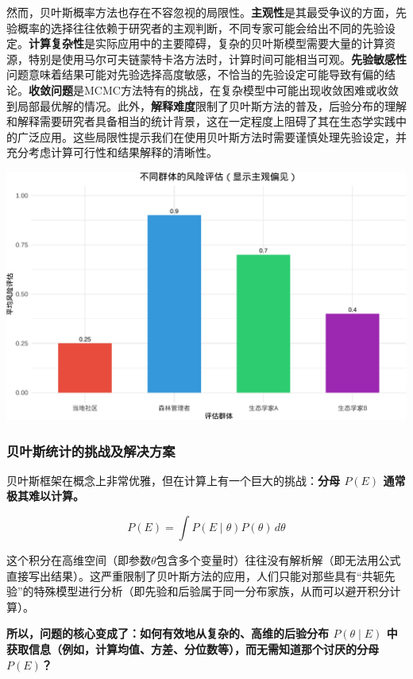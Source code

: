 \documentclass[
]{book}
\begin{document}
然而，贝叶斯概率方法也存在不容忽视的局限性。\textbf{主观性}是其最受争议的方面，先验概率的选择往往依赖于研究者的主观判断，不同专家可能会给出不同的先验设定。\textbf{计算复杂性}是实际应用中的主要障碍，复杂的贝叶斯模型需要大量的计算资源，特别是使用马尔可夫链蒙特卡洛方法时，计算时间可能相当可观。\textbf{先验敏感性}问题意味着结果可能对先验选择高度敏感，不恰当的先验设定可能导致有偏的结论。\textbf{收敛问题}是MCMC方法特有的挑战，在复杂模型中可能出现收敛困难或收敛到局部最优解的情况。此外，\textbf{解释难度}限制了贝叶斯方法的普及，后验分布的理解和解释需要研究者具备相当的统计背景，这在一定程度上阻碍了其在生态学实践中的广泛应用。这些局限性提示我们在使用贝叶斯方法时需要谨慎处理先验设定，并充分考虑计算可行性和结果解释的清晰性。

\begin{center}\includegraphics[width=0.8\linewidth]{ecological-statistics_files/figure-latex/unnamed-chunk-14-1} \end{center}

\hypertarget{ux8d1dux53f6ux65afux7edfux8ba1ux7684ux6311ux6218ux53caux89e3ux51b3ux65b9ux6848}{%
\subsubsection{贝叶斯统计的挑战及解决方案}\label{ux8d1dux53f6ux65afux7edfux8ba1ux7684ux6311ux6218ux53caux89e3ux51b3ux65b9ux6848}}

贝叶斯框架在概念上非常优雅，但在计算上有一个巨大的挑战：\textbf{分母 \(P(E)\) 通常极其难以计算。}

\[ P(E) = \int P(E \mid \theta) P(\theta) \, d\theta \]

这个积分在高维空间（即参数\(\theta\)包含多个变量时）往往没有解析解（即无法用公式直接写出结果）。这严重限制了贝叶斯方法的应用，人们只能对那些具有``共轭先验''的特殊模型进行分析（即先验和后验属于同一分布家族，从而可以避开积分计算）。

\textbf{所以，问题的核心变成了：如何有效地从复杂的、高维的后验分布 \(P(\theta \mid E)\) 中获取信息（例如，计算均值、方差、分位数等），而无需知道那个讨厌的分母 \(P(E)\)？}
\end{document}
